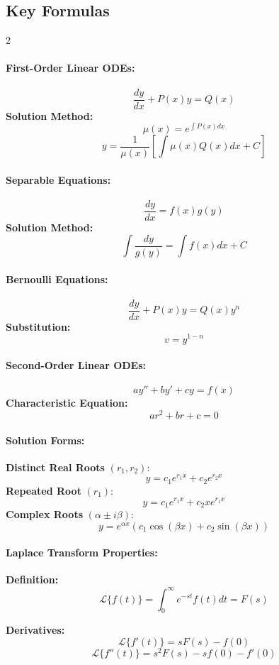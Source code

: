 \subsection*{Key Formulas}
\begin{multicols}{2}

\paragraph{First-Order Linear ODEs:}
\[
\frac{dy}{dx} + P(x)y = Q(x)
\]
\textbf{Solution Method:}
\[
\mu(x) = e^{\int P(x)dx}
\]
\[
y = \frac{1}{\mu(x)}\left[\int \mu(x)Q(x)dx + C\right]
\]

\paragraph{Separable Equations:}
\[
\frac{dy}{dx} = f(x)g(y)
\]
\textbf{Solution Method:}
\[
\int \frac{dy}{g(y)} = \int f(x)dx + C
\]

\paragraph{Bernoulli Equations:}
\[
\frac{dy}{dx} + P(x)y = Q(x)y^n
\]
\textbf{Substitution:}
\[
v = y^{1-n}
\]

\paragraph{Second-Order Linear ODEs:}
\[
ay'' + by' + cy = f(x)
\]
\textbf{Characteristic Equation:}
\[
ar^2 + br + c = 0
\]

\paragraph{Solution Forms:}
\textbf{Distinct Real Roots} $(r_1, r_2)$:
\[
y = c_1e^{r_1x} + c_2e^{r_2x}
\]
\textbf{Repeated Root} $(r_1)$:
\[
y = c_1e^{r_1x} + c_2xe^{r_1x}
\]
\textbf{Complex Roots} $(\alpha \pm i\beta)$:
\[
y = e^{\alpha x}(c_1\cos(\beta x) + c_2\sin(\beta x))
\]

\paragraph{Laplace Transform Properties:}

\textbf{Definition:}
\[
\mathcal{L}\{f(t)\} = \int_0^\infty e^{-st}f(t)dt = F(s)
\]

\textbf{Derivatives:}
\[
\mathcal{L}\{f'(t)\} = sF(s) - f(0)
\]
\[
\mathcal{L}\{f''(t)\} = s^2F(s) - sf(0) - f'(0)
\]


\end{multicols}

